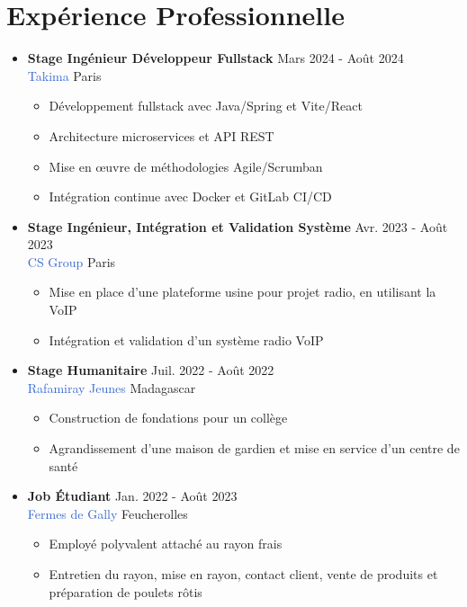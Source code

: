 \documentclass[11pt, a4paper]{article}
\begin{document}
\section*{Expérience Professionnelle}
\begin{itemize}
    \item \textbf{Stage Ingénieur Développeur Fullstack} \hfill Mars 2024 - Août 2024\\
          \textcolor{highlight}{Takima} \hfill Paris
          \begin{itemize}
              \item Développement fullstack avec Java/Spring et Vite/React
              \item Architecture microservices et API REST
              \item Mise en œuvre de méthodologies Agile/Scrumban
              \item Intégration continue avec Docker et GitLab CI/CD
          \end{itemize}

    \item \textbf{Stage Ingénieur, Intégration et Validation Système} \hfill Avr. 2023 - Août 2023\\
          \textcolor{highlight}{CS Group} \hfill Paris
          \begin{itemize}
              \item Mise en place d'une plateforme usine pour projet radio, en utilisant la VoIP
              \item Intégration et validation d'un système radio VoIP
          \end{itemize}

    \item \textbf{Stage Humanitaire} \hfill Juil. 2022 - Août 2022\\
          \textcolor{highlight}{Rafamiray Jeunes} \hfill Madagascar
          \begin{itemize}
              \item Construction de fondations pour un collège
              \item Agrandissement d'une maison de gardien et mise en service d'un centre de santé
          \end{itemize}

    \item \textbf{Job Étudiant} \hfill Jan. 2022 - Août 2023\\
          \textcolor{highlight}{Fermes de Gally} \hfill Feucherolles
          \begin{itemize}
              \item Employé polyvalent attaché au rayon frais
              \item Entretien du rayon, mise en rayon, contact client, vente de produits et préparation de poulets rôtis
          \end{itemize}
\end{itemize}
\end{document}
